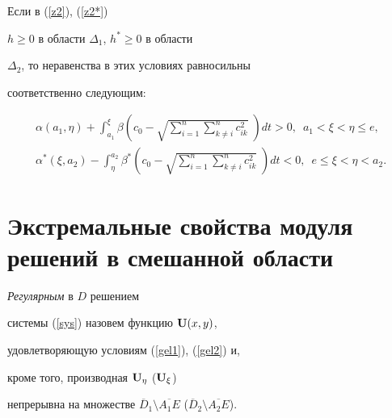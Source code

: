 \begin{note}


Если в (\ref{z2}), (\ref{z2*})\;


$h\geq0$ в области $\Delta_1$, $h^*\geq0$ в области


$\Delta_2$, то неравенства в этих условиях равносильны


соответственно следующим:


\begin{gather*}




\alpha (a_1,\eta)+


\int_{a_1}^{\xi }\beta\left(c_0-\sqrt{\sum_{i=1}^n\sum_{k\neq i}^n


c_{ik}^2}\;\right) dt>0,\ \; a_1<\xi <\eta \le e, \\




\alpha^* (\xi,a_2)-


\int_{\eta}^{a_2}\beta^*\left(c_0-\sqrt{\sum_{i=1}^n\sum_{k\neq i}^n


c_{ik}^2}\;\right) dt<0,\ \; e\le\xi <\eta < a_2.




\end{gather*}


\end{note}








\section{Экстремальные свойства модуля решений в смешанной области}





\begin{defn}


{\it Регулярным} в $D$ решением


системы (\ref{sys}) назовем функцию ${\bold U}(x,y)$,


удовлетворяющую условиям (\ref{gel1}), (\ref{gel2}) и,


кроме того, производная ${\bold U}_{\eta}$ (${\bold U}_{\xi}$)


непрерывна на множестве $\overline D_1 \setminus


\overline {A_1E}$ ($\overline D_2\setminus \overline


{A_2E}$).


\end{defn}





